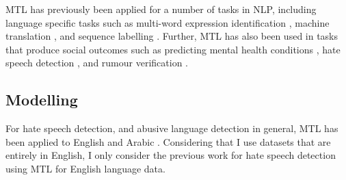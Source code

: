 MTL has previously been applied for a number of tasks in NLP, including language specific tasks such as multi-word expression identification \cite{Bingel-Bjerva:2018}, machine translation \cite{Dong:2015}, and sequence labelling \cite{Rei:2017}.
Further, MTL has also been used in tasks that produce social outcomes such as predicting mental health conditions \cite{Benton:2017}, hate speech detection \cite{Waseem:2018,Rajamanickam:2020,Farha:2020,Djandji:2019}, and rumour verification \cite{Kochkina:2018}.

\subsection{Modelling}
For hate speech detection, and abusive language detection in general, MTL has been applied to English \citep{Waseem:2018,Rajamanickam:2020} and Arabic \citep{Farha:2020,Djandji:2019}.
Considering that I use datasets that are entirely in English, I only consider the previous work for hate speech detection using MTL for English language data.

